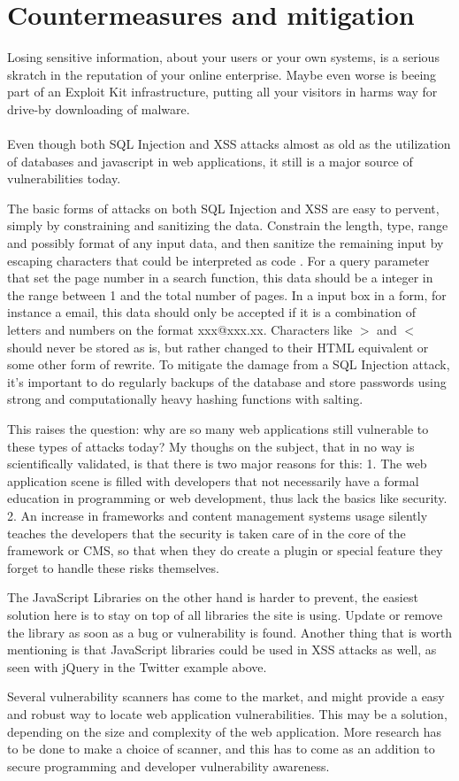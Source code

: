 \section{Countermeasures and mitigation}
Losing sensitive information, about your users or your own systems, is a serious skratch in the reputation of your online enterprise. Maybe even worse is beeing part of an Exploit Kit infrastructure, putting all your visitors in harms way for drive-by downloading of malware. 
\\ \\
Even though both SQL Injection and XSS attacks almost as old as the utilization of databases and javascript in web applications, it still is a major source of vulnerabilities today. 

The basic forms of attacks on both SQL Injection and XSS are easy to pervent, simply by constraining and sanitizing the data. Constrain the length, type, range and possibly format of any input data, and then sanitize the remaining input by escaping characters that could be interpreted as code \cite{Bisson2005}. For a query parameter that set the page number in a search function, this data should be a integer in the range between 1 and the total number of pages. In a input box in a form, for instance a email, this data should only be accepted if it is a combination of letters and numbers on the format xxx@xxx.xx. Characters like $>$ and $<$ should never be stored as is, but rather changed to their HTML equivalent or some other form of rewrite. To mitigate the damage from a SQL Injection attack, it's important to do regularly backups of the database and store passwords using strong and computationally heavy hashing functions with salting.  

This raises the question: why are so many web applications still vulnerable to these types of attacks today? My thoughs on the subject, that in no way is scientifically validated, is that there is two major reasons for this: 1. The web application scene is filled with developers that not necessarily have a formal education in programming or web development, thus lack the basics like security. 2. An increase in frameworks and content management systems usage silently teaches the developers that the security is taken care of in the core of the framework or CMS, so that when they do create a plugin or special feature they forget to handle these risks themselves.

The JavaScript Libraries on the other hand is harder to prevent, the easiest solution here is to stay on top of all libraries the site is using. Update or remove the library as soon as a bug or vulnerability is found. Another thing that is worth mentioning is that JavaScript libraries could be used in XSS attacks as well, as seen with jQuery in the Twitter example above.

Several vulnerability scanners has come to the market, and might provide a easy and robust way to locate web application vulnerabilities. This may be a solution, depending on the size and complexity of the web application. More research has to be done to make a choice of scanner, and this has to come as an addition to secure programming and developer vulnerability awareness.